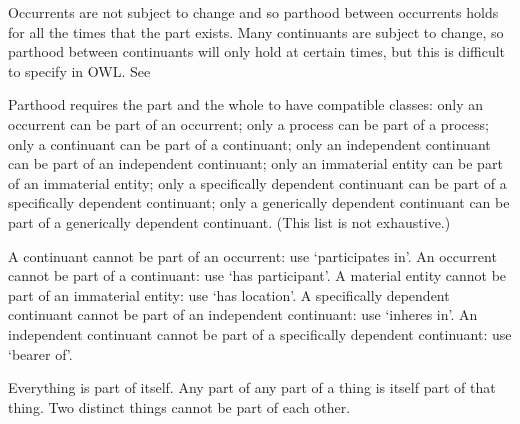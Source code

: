 \documentclass[letterpaper,10pt,english]{sphinxmanual}
\begin{document}
\begin{sphinxShadowBox}

\sphinxAtStartPar
Occurrents are not subject to change and so parthood between occurrents holds for all the times that the part exists. Many continuants are subject to change, so parthood between continuants will only hold at certain times, but this is difficult to specify in OWL. See 

\sphinxAtStartPar
Parthood requires the part and the whole to have compatible classes: only an occurrent can be part of an occurrent; only a process can be part of a process; only a continuant can be part of a continuant; only an independent continuant can be part of an independent continuant; only an immaterial entity can be part of an immaterial entity; only a specifically dependent continuant can be part of a specifically dependent continuant; only a generically dependent continuant can be part of a generically dependent continuant. (This list is not exhaustive.)

\sphinxAtStartPar
A continuant cannot be part of an occurrent: use ‘participates in’. An occurrent cannot be part of a continuant: use ‘has participant’. A material entity cannot be part of an immaterial entity: use ‘has location’. A specifically dependent continuant cannot be part of an independent continuant: use ‘inheres in’. An independent continuant cannot be part of a specifically dependent continuant: use ‘bearer of’.

\sphinxAtStartPar
Everything is part of itself. Any part of any part of a thing is itself part of that thing. Two distinct things cannot be part of each other.
\end{sphinxShadowBox}

\begin{sphinxShadowBox}

\sphinxAtStartPar
{}
\end{sphinxShadowBox}

\begin{sphinxShadowBox}

\sphinxAtStartPar
{}

\sphinxAtStartPar
{}

\sphinxAtStartPar
{}
\end{sphinxShadowBox}
\begin{quote}

\ignorespaces \end{quote}
\end{document}
